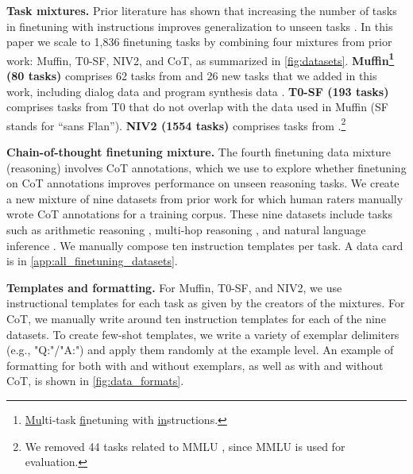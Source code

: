 \textbf{Task mixtures.} Prior literature has shown that increasing the number of tasks in finetuning with instructions improves generalization to unseen tasks \citep[][\textit{inter alia}]{wei2021finetuned,sanh2021multitask}. In this paper we scale to 1,836 finetuning tasks by combining four mixtures from prior work: Muffin, T0-SF, NIV2, and CoT, as summarized in \ref{fig:datasets}.
\textbf{Muffin\footnote{\underline{Mu}lti-task \underline{f}inetuning with \underline{in}structions.} (80 tasks)} comprises 62 tasks from \citet{wei2021finetuned} and 26 new tasks that we added in this work, including dialog data \citep{byrne-etal-2019-taskmaster,anantha-etal-2021-open,pmlr-v162-dai22a} and program synthesis data \citep{yasunaga2020graph,li2022competition}.
\textbf{T0-SF (193 tasks)} comprises tasks from T0 \citep{sanh2021multitask} that do not overlap with the data used in Muffin (SF stands for ``sans Flan'').
\textbf{NIV2 (1554 tasks)} comprises tasks from \citet{wang2022benchmarking}.\footnote{We removed 44 tasks related to MMLU \citep{hendrycks2020measuring}, since MMLU is used for evaluation.}

\textbf{Chain-of-thought finetuning mixture.} The fourth finetuning data mixture (reasoning) involves CoT annotations, which we use to explore whether finetuning on CoT annotations improves performance on unseen reasoning tasks. We create a new mixture of nine datasets from prior work for which human raters manually wrote CoT annotations for a training corpus. These nine datasets include tasks such as arithmetic reasoning \citep{cobbe2021training}, multi-hop reasoning \citep{geva-etal-2021-aristotle}, and natural language inference \citep{camburu-etal-2020-make}. We manually compose ten instruction templates per task. A data card is in \ref{app:all_finetuning_datasets}.

\textbf{Templates and formatting.} For Muffin, T0-SF, and NIV2, we use instructional templates for each task as given by the creators of the mixtures. For CoT, we manually write around ten instruction templates for each of the nine datasets. To create few-shot templates, we write a variety of exemplar delimiters (e.g., "Q:"/"A:") and apply them randomly at the example level. An example of formatting for both with and without exemplars, as well as with and without CoT, is shown in \ref{fig:data_formats}.

